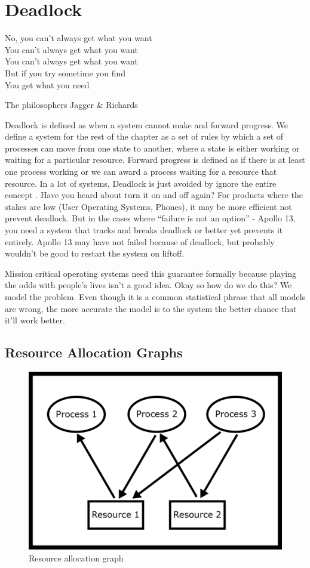 \chapter{Deadlock}

\epigraph{No, you can't always get what you want
\\You can't always get what you want
\\You can't always get what you want
\\But if you try sometime you find
\\You get what you need}{The philosophers Jagger \& Richards}

\gls{Deadlock} is defined as when a system cannot make and forward progress.
We define a system for the rest of the chapter as a set of rules by which a set of processes can move from one state to another, where a state is either working or waiting for a particular resource.
Forward progress is defined as if there is at least one process working or we can award a process waiting for a resource that resource.
In a lot of systems, Deadlock is just avoided by ignore the entire concept \cite[P.237]{silberschatz2006operating}.
Have you heard about turn it on and off again?
For products where the stakes are low (User Operating Systems, Phones), it may be more efficient not prevent deadlock.
But in the cases where ``failure is not an option'' - Apollo 13, you need a system that tracks and breaks deadlock or better yet prevents it entirely.
Apollo 13 may have not failed because of deadlock, but probably wouldn't be good to restart the system on liftoff.

Mission critical operating systems need this guarantee formally because playing the odds with people's lives isn't a good idea.
Okay so how do we do this? We model the problem.
Even though it is a common statistical phrase that all models are wrong, the more accurate the model is to the system the better chance that it'll work better.

\section{Resource Allocation Graphs}

\begin{figure}
\centering
\includegraphics[width=.6\textwidth]{deadlock/drawings/rag.png}
\caption{Resource allocation graph}
\label{ragfigure}
\end{figure}


